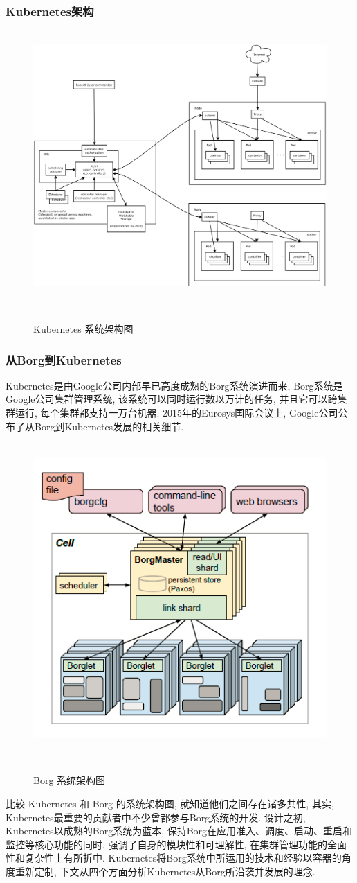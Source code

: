 \documentclass[UTF8,a4paper]{ctexart}
\begin{document}
\subsubsection{Kubernetes架构}
\begin{figure}[htb]
   　　\centering
   　　\includegraphics[width=.9\textwidth]{diagram/k8s_arch.png}
   　　\caption{Kubernetes 系统架构图}
   　　\label{k8s_arch}
\end{figure}

\subsubsection{从Borg到Kubernetes}
Kubernetes是由Google公司内部早已高度成熟的Borg系统演进而来, Borg系统是Google公司集群管理系统, 该系统可以同时运行数以万计的任务, 并且它可以跨集群运行, 每个集群都支持一万台机器. 2015年的Eurosys国际会议上, Google公司公布了从Borg到Kubernetes发展的相关细节.
\begin{figure}[htb]
   　　\centering
   　　\includegraphics[width=.6\textwidth]{diagram/borg_arch.png}
   　　\caption{Borg 系统架构图}
   　　\label{borg_arch}
\end{figure}
比较 Kubernetes 和 Borg 的系统架构图, 就知道他们之间存在诸多共性, 其实, Kubernetes最重要的贡献者中不少曾都参与Borg系统的开发. 设计之初, Kubernetes以成熟的Borg系统为蓝本, 保持Borg在应用准入、调度、启动、重启和监控等核心功能的同时, 强调了自身的模块性和可理解性, 在集群管理功能的全面性和复杂性上有所折中. Kubernetes将Borg系统中所运用的技术和经验以容器的角度重新定制, 下文从四个方面分析Kubernetes从Borg所沿袭并发展的理念.
\end{document}
